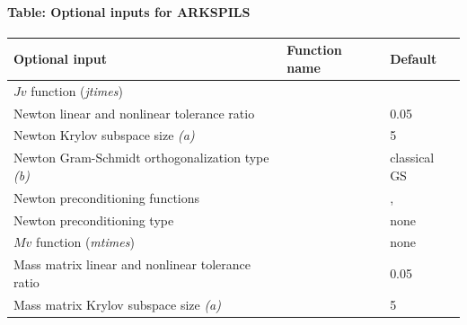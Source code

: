 \documentclass[letterpaper,10pt,english]{sphinxmanual}
\begin{document}
\paragraph{Table: Optional inputs for ARKSPILS}
\label{c_interface/User_callable:cinterface-arkspilsinputtable}\label{c_interface/User_callable:table-optional-inputs-for-arkspils}
\begin{tabulary}{\linewidth}{|L|L|L|}
\hline
\textbf{
Optional input
} & \textbf{
Function name
} & \textbf{
Default
}\\\hline

$Jv$ function (\emph{jtimes})
 & 
{\hyperref[c_interface/User_callable:ARKSpilsSetJacTimesVecFn]{}}
 & 
\\\hline

Newton linear and nonlinear tolerance ratio
 & 
{\hyperref[c_interface/User_callable:ARKSpilsSetEpsLin]{}}
 & 
0.05
\\\hline

Newton Krylov subspace size \emph{(a)}
 & 
{\hyperref[c_interface/User_callable:ARKSpilsSetMaxl]{}}
 & 
5
\\\hline

Newton Gram-Schmidt orthogonalization type \emph{(b)}
 & 
{\hyperref[c_interface/User_callable:ARKSpilsSetGSType]{}}
 & 
classical GS
\\\hline

Newton preconditioning functions
 & 
{\hyperref[c_interface/User_callable:ARKSpilsSetPreconditioner]{}}
 & 
, 
\\\hline

Newton preconditioning type
 & 
{\hyperref[c_interface/User_callable:ARKSpilsSetPrecType]{}}
 & 
none
\\\hline

$Mv$ function (\emph{mtimes})
 & 
{\hyperref[c_interface/User_callable:ARKSpilsSetMassTimesVecFn]{}}
 & 
none
\\\hline

Mass matrix linear and nonlinear tolerance ratio
 & 
{\hyperref[c_interface/User_callable:ARKSpilsSetMassEpsLin]{}}
 & 
0.05
\\\hline

Mass matrix Krylov subspace size \emph{(a)}
 & 
{\hyperref[c_interface/User_callable:ARKSpilsSetMassMaxl]{}}
 & 
5
\\\hline


\end{tabulary}
\end{document}
